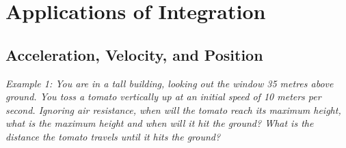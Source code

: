 \section{Applications of Integration}

    \subsection{Acceleration, Velocity, and Position}

        \color{blue} \textit{Example 1: You are in a tall building, looking out the window 35 metres above ground. You toss a tomato vertically up at an initial speed of 10 meters per second. Ignoring air resistance,
        when will the tomato reach its maximum height, what is the maximum height and when will it hit the ground? What is the distance the tomato travels until it hits the ground?} \color{black} \\



